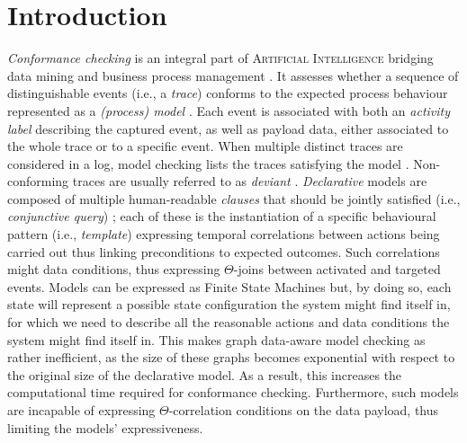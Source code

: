 \section{Introduction}

\textit{Conformance checking} is an integral part of \textsc{Artificial Intelligence} {bridging} data mining and business process management \cite{bpm21}. It assesses whether a sequence of distinguishable events (i.e., a \textit{trace}) conforms to the expected process behaviour represented as a \textit{(process) model} \cite{RozinatA08}. Each event is associated with both an \textit{activity label} describing the captured event, as well as payload data, either associated to the whole trace or to a specific event. When multiple distinct traces are considered in a log, model checking lists the %
 traces satisfying the model \cite{BurattinMS16}. Non-conforming traces  are usually referred to as \textit{deviant} \cite{bpm21}.  \textit{Declarative} models are composed of multiple human-readable \textit{clauses} that should be  jointly satisfied (i.e., \textit{conjunctive query}) \cite{Li2020}; each of these is the instantiation of a specific behavioural pattern (i.e., \textit{template}) expressing temporal correlations between actions being carried out thus linking preconditions to expected outcomes. Such correlations might %
 data conditions, thus expressing $\Theta$-joins between activated and targeted events. %
 Models
 can be %
 expressed as Finite State Machines \cite{MultiPerspective,AgostinelliBFMM21} %
 but, by doing so, each state will represent a possible state configuration the system might find itself in, for which we need to describe all the reasonable actions and data conditions the system might find itself in. This makes graph data-aware model checking as \cite{bpm21} rather inefficient, as the size of these graphs becomes exponential with respect to the original size of the declarative model. As a result, this increases the computational time required for conformance checking. Furthermore, such models are incapable of expressing $\Theta$-correlation conditions on the data payload, thus limiting the models' expressiveness.
 
